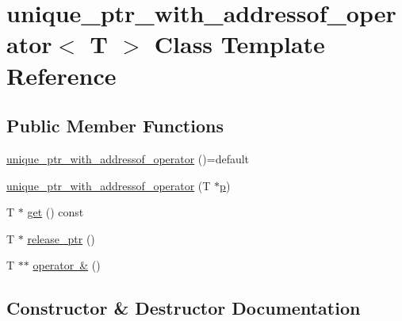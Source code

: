 \hypertarget{classunique__ptr__with__addressof__operator}{}\section{unique\+\_\+ptr\+\_\+with\+\_\+addressof\+\_\+operator$<$ T $>$ Class Template Reference}
\label{classunique__ptr__with__addressof__operator}
\subsection*{Public Member Functions}
\begin{DoxyCompactItemize}
\item 
\mbox{\hyperlink{classunique__ptr__with__addressof__operator_a9fad027e4f06b0de34de3a15e1ed50df}{unique\+\_\+ptr\+\_\+with\+\_\+addressof\+\_\+operator}} ()=default
\item 
\mbox{\hyperlink{classunique__ptr__with__addressof__operator_aec1b5d72917563f44fcd3448592f9dc0}{unique\+\_\+ptr\+\_\+with\+\_\+addressof\+\_\+operator}} (T $\ast$\mbox{\hyperlink{_s_d_l__opengl__glext_8h_aa5367c14d90f462230c2611b81b41d23}{p}})
\item 
T $\ast$ \mbox{\hyperlink{classunique__ptr__with__addressof__operator_a5f5c32b8a99228a7685d03ad00ec723a}{get}} () const
\item 
T $\ast$ \mbox{\hyperlink{classunique__ptr__with__addressof__operator_aad95d7bacc382a862d256b6b246864f1}{release\+\_\+ptr}} ()
\item 
T $\ast$$\ast$ \mbox{\hyperlink{classunique__ptr__with__addressof__operator_a1a61a13e5f8d71ec248d5ef1b4f25017}{operator \&}} ()
\end{DoxyCompactItemize}


\subsection{Constructor \& Destructor Documentation}
\mbox{\label{classunique__ptr__with__addressof__operator_a9fad027e4f06b0de34de3a15e1ed50df}} 
